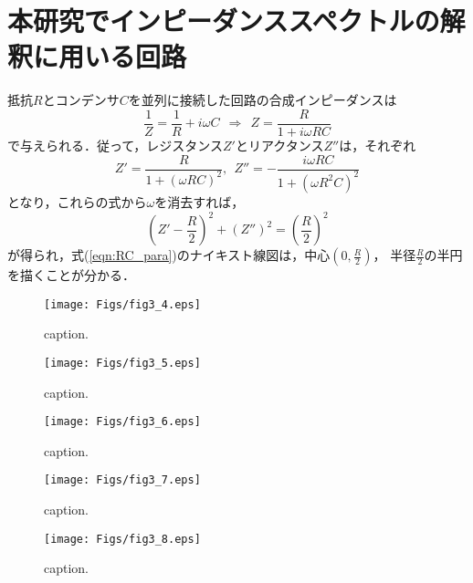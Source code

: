 \section{本研究でインピーダンススペクトルの解釈に用いる回路}
抵抗$R$とコンデンサ$C$を並列に接続した回路の合成インピーダンスは
\begin{equation}
	\frac{1}{Z}=\frac{1}{R} + i\omega C \ \ 
	\Rightarrow \ \ Z =\frac{R}{1+i\omega RC}
	\label{eqn:RC_para}
\end{equation}
で与えられる．従って，レジスタンス$Z'$とリアクタンス$Z''$は，それぞれ
\begin{equation}
	Z'=\frac{R}{1+(\omega RC)^2}, \ \ 
	Z''=-\frac{i\omega RC}{1+(\omega R^2C)^2} 
	\label{eqn:}
\end{equation}
となり，これらの式から$\omega$を消去すれば，
\begin{equation}
	\left( Z'-\frac{R}{2}\right)^2 +\left(Z''\right)^2 =\left( \frac{R}{2}\right)^2
	\label{eqn:}
\end{equation}
が得られ，式(\ref{eqn:RC_para})のナイキスト線図は，中心$\left( 0, \frac{R}{2}\right)$，
半径$\frac{R}{2}$の半円を描くことが分かる．

\begin{figure}[h]
	\begin{center}
	\texttt{[image: Figs/fig3\_4.eps]} 
	\end{center}
	\caption{
		caption.
	} 
	\label{fig:fig3_4}
\end{figure}
\begin{figure}[h]
	\begin{center}
	\texttt{[image: Figs/fig3\_5.eps]} 
	\end{center}
	\caption{
		caption.
	} 
	\label{fig:fig3_5}
\end{figure}
\begin{figure}[h]
	\begin{center}
	\texttt{[image: Figs/fig3\_6.eps]} 
	\end{center}
	\caption{
		caption.
	} 
	\label{fig:fig3_6}
\end{figure}
\begin{figure}[h]
	\begin{center}
	\texttt{[image: Figs/fig3\_7.eps]} 
	\end{center}
	\caption{
		caption.
	} 
	\label{fig:fig3_7}
\end{figure}
\begin{figure}[h]
	\begin{center}
	\texttt{[image: Figs/fig3\_8.eps]} 
	\end{center}
	\caption{
		caption.
	} 
	\label{fig:fig3_8}
\end{figure}
